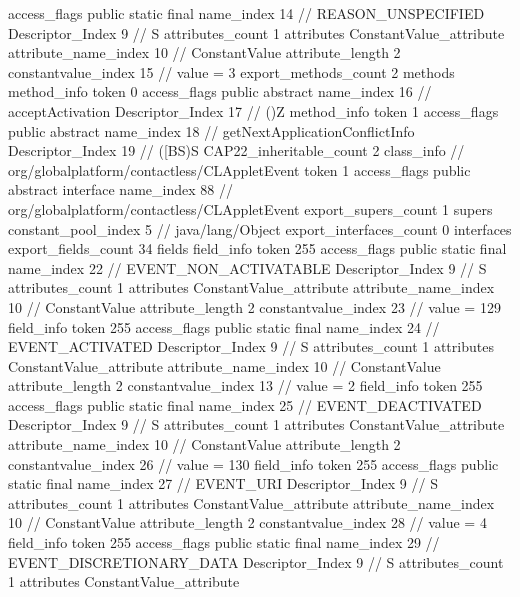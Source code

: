 {{{{{				access_flags	public static final
				name_index	14		// REASON_UNSPECIFIED
				Descriptor_Index	9		// S
				attributes_count	1
				attributes {
				ConstantValue_attribute {
					attribute_name_index	10		// ConstantValue
					attribute_length	2
					constantvalue_index	15		// value = 3
				}
				}
			}
			}
			export_methods_count	2
			methods {
				method_info {
					token	0
					access_flags	public abstract
					name_index	16		// acceptActivation
					Descriptor_Index	17		// ()Z
				}
				method_info {
					token	1
					access_flags	public abstract
					name_index	18		// getNextApplicationConflictInfo
					Descriptor_Index	19		// ([BS)S
				}
			}
			CAP22_inheritable_count	2
		}
		class_info {		// org/globalplatform/contactless/CLAppletEvent
			token	1
			access_flags	public abstract interface
			name_index	88		// org/globalplatform/contactless/CLAppletEvent
			export_supers_count	1
			supers {
				constant_pool_index	5		// java/lang/Object
			}
			export_interfaces_count	0
			interfaces {
			}
			export_fields_count	34
			fields {
			field_info {
				token	255
				access_flags	public static final
				name_index	22		// EVENT_NON_ACTIVATABLE
				Descriptor_Index	9		// S
				attributes_count	1
				attributes {
				ConstantValue_attribute {
					attribute_name_index	10		// ConstantValue
					attribute_length	2
					constantvalue_index	23		// value = 129
				}
				}
			}
			field_info {
				token	255
				access_flags	public static final
				name_index	24		// EVENT_ACTIVATED
				Descriptor_Index	9		// S
				attributes_count	1
				attributes {
				ConstantValue_attribute {
					attribute_name_index	10		// ConstantValue
					attribute_length	2
					constantvalue_index	13		// value = 2
				}
				}
			}
			field_info {
				token	255
				access_flags	public static final
				name_index	25		// EVENT_DEACTIVATED
				Descriptor_Index	9		// S
				attributes_count	1
				attributes {
				ConstantValue_attribute {
					attribute_name_index	10		// ConstantValue
					attribute_length	2
					constantvalue_index	26		// value = 130
				}
				}
			}
			field_info {
				token	255
				access_flags	public static final
				name_index	27		// EVENT_URI
				Descriptor_Index	9		// S
				attributes_count	1
				attributes {
				ConstantValue_attribute {
					attribute_name_index	10		// ConstantValue
					attribute_length	2
					constantvalue_index	28		// value = 4
				}
				}
			}
			field_info {
				token	255
				access_flags	public static final
				name_index	29		// EVENT_DISCRETIONARY_DATA
				Descriptor_Index	9		// S
				attributes_count	1
				attributes {
				ConstantValue_attribute {
}}}}}}}
